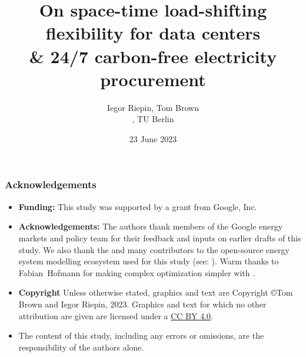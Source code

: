 


\title{On space-time load-shifting flexibility for data centers \\ 
      \& 24/7 carbon-free electricity procurement}

\author{
  Iegor Riepin, Tom Brown\\
  , TU Berlin
  }

\date{23 June 2023}




\maketitle

\begin{frame}
  \frametitle{Acknowledgements}

  \begin{itemize}
    \item {\bf Funding:} This study was supported by a grant from Google, Inc. 
    \item {\bf Acknowledgements:} The authors thank members of the Google energy markets and policy team 
    for their feedback and inputs on earlier drafts of this study. 
    We also thank the  and many contributors to the open-source 
    energy system modelling ecosystem used for this study (see: ).
    Warm thanks to Fabian~Hofmann for making complex optimization simpler with . 
    \item 
    {\bf Copyright} Unless otherwise stated, graphics and text are Copyright \copyright Tom Brown and Iegor Riepin, 2023.
    Graphics and text for which no other attribution are given are licensed under a 
    \href{https://creativecommons.org/licenses/by/4.0/}{CC BY 4.0}.  {\footnotesize \ccby} 
    \item The content of this study, including any errors or omissions, are the responsibility
    of the authors alone.
  \end{itemize}

\end{frame}


